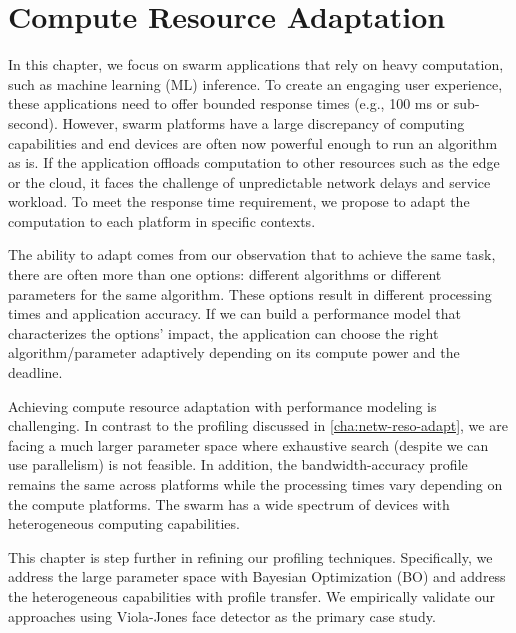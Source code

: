 \documentclass[thesis.tex]{subfiles}
\begin{document}
\chapter{Compute Resource Adaptation}
\label{cha:comp-reso-adapt}

In this chapter, we focus on swarm applications that rely on heavy computation,
such as machine learning (ML) inference. To create an engaging user experience,
these applications need to offer bounded response times (e.g., 100 ms or
sub-second). However, swarm platforms have a large discrepancy of computing
capabilities and end devices are often now powerful enough to run an algorithm
as is. If the application offloads computation to other resources such as the
edge or the cloud, it faces the challenge of unpredictable network delays and
service workload. To meet the response time requirement, we propose to adapt the
computation to each platform in specific contexts.

The ability to adapt comes from our observation that to achieve the same task,
there are often more than one options: different algorithms or different
parameters for the same algorithm. These options result in different processing
times and application accuracy. If we can build a performance model that
characterizes the options' impact, the application can choose the right
algorithm/parameter adaptively depending on its compute power and the deadline.

Achieving compute resource adaptation with performance modeling is
challenging. In contrast to the profiling discussed in
\autoref{cha:netw-reso-adapt}, we are facing a much larger parameter space where
exhaustive search (despite we can use parallelism) is not feasible. In addition,
the bandwidth-accuracy profile remains the same across platforms while the
processing times vary depending on the compute platforms. The swarm has a wide
spectrum of devices with heterogeneous computing capabilities.

This chapter is step further in refining our profiling techniques. Specifically,
we address the large parameter space with Bayesian Optimization (BO) and address
the heterogeneous capabilities with profile transfer. We empirically validate
our approaches using Viola-Jones face detector as the primary case study.






\end{document}

